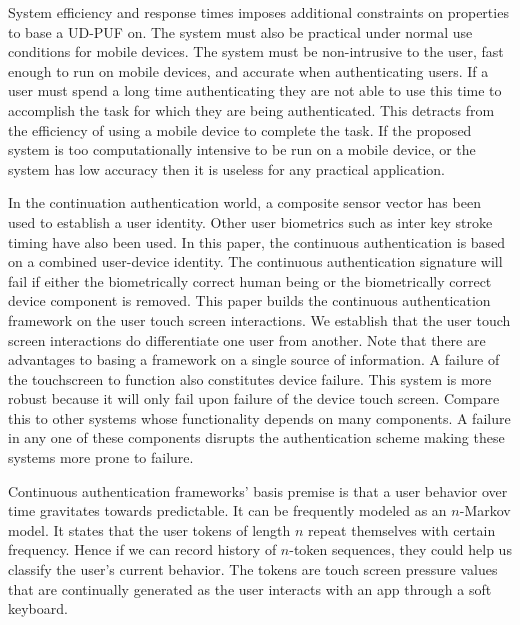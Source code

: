 \documentclass{acm_proc_article-sp}
\begin{document}
System efficiency and response times imposes additional constraints on properties to base a UD-PUF on.
The system must also be practical under normal use conditions for mobile devices. The system must be non-intrusive to the user, fast enough to run on mobile devices, and accurate when authenticating users. If a user must spend a long time authenticating they are not able to use this time to accomplish the task for which they are being authenticated. This detracts from the efficiency of using a mobile device to complete the task. If the proposed system is too computationally intensive to be run on a mobile device, or the system has low accuracy then it is useless for any practical application. 

In the continuation authentication world, a composite sensor vector \cite{zhu2013sensec} has been used
to establish a user identity. Other user biometrics such as inter key stroke timing have also been
used. In this paper, the continuous authentication is based on a combined user-device identity.
The continuous authentication signature will fail if either the biometrically correct human being
or the biometrically correct device component is removed.
 This paper builds the continuous authentication framework on the user touch screen interactions.
We establish that the user touch screen interactions do differentiate one user from another. 
Note that there are advantages to basing a framework on a single source of information. A failure of the touchscreen to function also constitutes device failure. This system is more robust because it will only fail upon failure of the device touch screen. Compare this to other systems whose functionality depends on many components. A failure in any one of these components disrupts the authentication scheme making these systems more prone to failure. 


Continuous authentication frameworks' basis premise is that a user behavior over time gravitates
towards  predictable. It can be frequently modeled as an $n$-Markov model. It states that the
user tokens of length $n$ repeat themselves with certain frequency. Hence if we can record history
of $n$-token sequences, they could help us classify the user's current behavior. The tokens are
touch screen pressure values that are continually generated as the user interacts with an app
through a soft keyboard.
\end{document}

